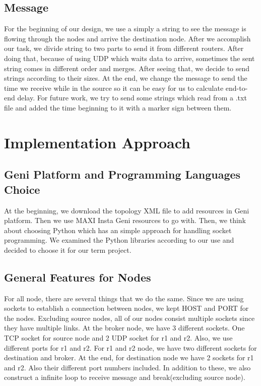 \documentclass[conference]{IEEEtran}
\begin{document}
\subsection{Message}

For the beginning of our design, we use a simply a string to see the message is flowing through the nodes and arrive the destination node. After we accomplish our task, we divide string to two parts to send it from different routers. After doing that, because of using UDP which waits data to arrive, sometimes the sent string comes in different order and merges. After seeing that, we decide to send strings according to their sizes. At the end, we change the message to send the time we receive while in the source so it can be easy for us to calculate end-to-end delay. For future work, we try to send some strings which read from a .txt file and added the time beginning to it with a marker sign between them.


\section{Implementation Approach}

\subsection{Geni Platform and Programming Languages Choice}

At the beginning, we download the topology XML file to add resources in Geni platform. Then we use MAXI Insta Geni resources to go with. Then, we think about choosing Python which has an simple approach for handling socket programming. We examined the Python libraries according to our use and decided to choose it for our term project.
\subsection{General Features for Nodes}

For all node, there are several things that we do the same. Since we are using sockets to establish a connection between nodes, we kept HOST and PORT for the nodes. Excluding source nodes, all of our nodes consist multiple sockets since they have multiple links. At the broker node, we have 3 different sockets. One TCP socket for source node and 2 UDP socket for r1 and r2. Also, we use different ports for r1 and r2. For r1 and r2 node, we have two different sockets for destination and broker. At the end, for destination node we have 2 sockets for r1 and r2. Also their different port numbers included. In addition to these, we also construct a infinite loop to receive message and break(excluding source node).
\end{document}
